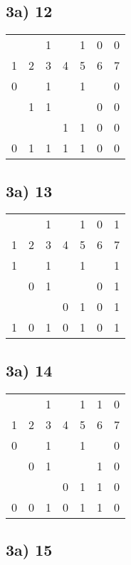 \documentclass[]{article}
\begin{document}
\pagebreak

\subsection{3a) 12}

\begin{longtable}[l]{@{}lllllll@{}}
	\toprule
	 & &1& &1&0&0\\
	1&2&3&4&5&6&7\\
	\endhead
	\midrule
	0& &1& &1& &0\\
	 &1&1& & &0&0\\
	 & & &1&1&0&0\\
	\hline
	0&1&1&1&1&0&0\\
	\bottomrule
\end{longtable}

\subsection{3a) 13}

\begin{longtable}[l]{@{}lllllll@{}}
	\toprule
	 & &1& &1&0&1\\
	1&2&3&4&5&6&7\\
	\endhead
	\midrule
	1& &1& &1& &1\\
	 &0&1& & &0&1\\
	 & & &0&1&0&1\\
	\hline
	1&0&1&0&1&0&1\\
	\bottomrule
\end{longtable}

\subsection{3a) 14}

\begin{longtable}[l]{@{}lllllll@{}}
	\toprule
	 & &1& &1&1&0\\
	1&2&3&4&5&6&7\\
	\endhead
	\midrule
	0& &1& &1& &0\\
	 &0&1& & &1&0\\
	 & & &0&1&1&0\\
	\hline
	0&0&1&0&1&1&0\\
	\bottomrule
\end{longtable}

\subsection{3a) 15}
\end{document}
